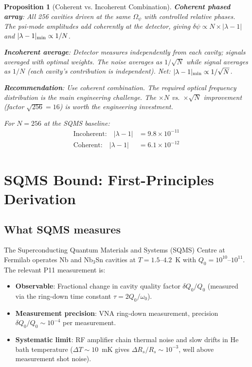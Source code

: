 \documentclass[11pt,twocolumn]{article}
\newcommand{\lam}{\lambda}
\newcommand{\Opsi}{\Omega_\psi}
\newcommand{\ee}[1]{\times 10^{#1}}
\newtheorem{proposition}[theorem]{Proposition}
\begin{document}
\begin{proposition}[Coherent vs. Incoherent Combination]
\label{prop:combination}
\textbf{Coherent phased array}: All 256 cavities driven at the same
$\Opsi$ with controlled relative phases. The psi-mode amplitudes add
coherently at the detector, giving $\delta\psi \propto N\times|\lam-1|$
and $|\lam-1|_{\rm min}\propto 1/N$.

\textbf{Incoherent average}: Detector measures independently from each
cavity; signals averaged with optimal weights. The noise averages as
$1/\sqrt{N}$ while signal averages as $1/N$ (each cavity's contribution
is independent). Net: $|\lam-1|_{\rm min}\propto 1/\sqrt{N}$.

\textbf{Recommendation}: Use coherent combination. The required optical
frequency distribution is the main engineering challenge. The $\times N$
vs.\ $\times\sqrt{N}$ improvement (factor $\sqrt{256} = 16$) is worth
the engineering investment.

For $N = 256$ at the SQMS baseline:
\begin{align}
\text{Incoherent:}\quad|\lam-1| &= 9.8\ee{-11}\\
\text{Coherent:}\quad|\lam-1| &= 6.1\ee{-12}
\end{align}
\end{proposition}


\section{SQMS Bound: First-Principles Derivation}
\label{sec:sqms_derivation}

\subsection{What SQMS measures}
\label{sec:sqms_measurement}

The Superconducting Quantum Materials and Systems (SQMS) Centre at Fermilab
operates Nb and Nb$_3$Sn cavities at $T = 1.5$--$4.2$~K with
$Q_0 = 10^{10}$--$10^{11}$. The relevant P11 measurement is:

\begin{itemize}[nosep]
\item \textbf{Observable}: Fractional change in cavity quality factor
  $\delta Q_0/Q_0$ (measured via the ring-down time constant
  $\tau = 2Q_0/\omega_0$).
\item \textbf{Measurement precision}: VNA ring-down measurement,
  precision $\delta Q_0/Q_0 \sim 10^{-4}$ per measurement.
\item \textbf{Systematic limit}: RF amplifier chain thermal noise and
  slow drifts in He bath temperature ($\Delta T \sim 10$~mK gives
  $\Delta R_s/R_s \sim 10^{-3}$, well above measurement shot noise).
\end{itemize}
\end{document}

